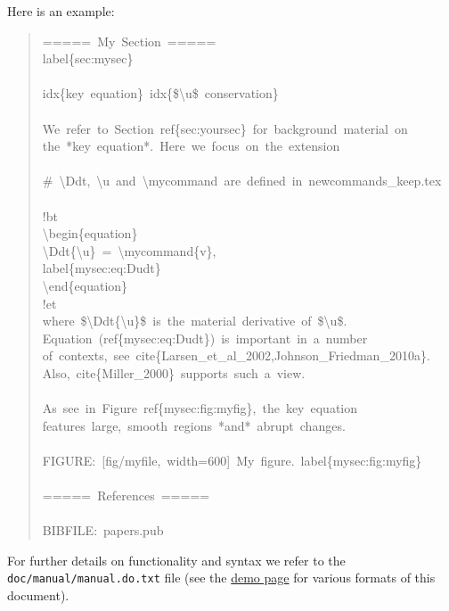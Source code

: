 \documentclass[a4paper]{article}
\begin{document}
Here is an example:
%
\begin{quote}{\ttfamily \raggedright \noindent
=====~My~Section~=====\\
label\{sec:mysec\}\\
~\\
idx\{key~equation\}~idx\{\$\textbackslash{}u\$~conservation\}\\
~\\
We~refer~to~Section~ref\{sec:yoursec\}~for~background~material~on\\
the~*key~equation*.~Here~we~focus~on~the~extension\\
~\\
\#~\textbackslash{}Ddt,~\textbackslash{}u~and~\textbackslash{}mycommand~are~defined~in~newcommands\_keep.tex\\
~\\
!bt\\
\textbackslash{}begin\{equation\}\\
\textbackslash{}Ddt\{\textbackslash{}u\}~=~\textbackslash{}mycommand\{v\},\\
label\{mysec:eq:Dudt\}\\
\textbackslash{}end\{equation\}\\
!et\\
where~\$\textbackslash{}Ddt\{\textbackslash{}u\}\$~is~the~material~derivative~of~\$\textbackslash{}u\$.\\
Equation~(ref\{mysec:eq:Dudt\})~is~important~in~a~number\\
of~contexts,~see~cite\{Larsen\_et\_al\_2002,Johnson\_Friedman\_2010a\}.\\
Also,~cite\{Miller\_2000\}~supports~such~a~view.\\
~\\
As~see~in~Figure~ref\{mysec:fig:myfig\},~the~key~equation\\
features~large,~smooth~regions~*and*~abrupt~changes.\\
~\\
FIGURE:~{[}fig/myfile,~width=600{]}~My~figure.~label\{mysec:fig:myfig\}\\
~\\
=====~References~=====\\
~\\
BIBFILE:~papers.pub
}
\end{quote}

For further details on functionality and
syntax we refer to the \texttt{doc/manual/manual.do.txt} file (see the
\href{https://doconce.googlecode.com/hg/doc/demos/manual/index.html}{demo page}
for various formats of this document).
\end{document}
